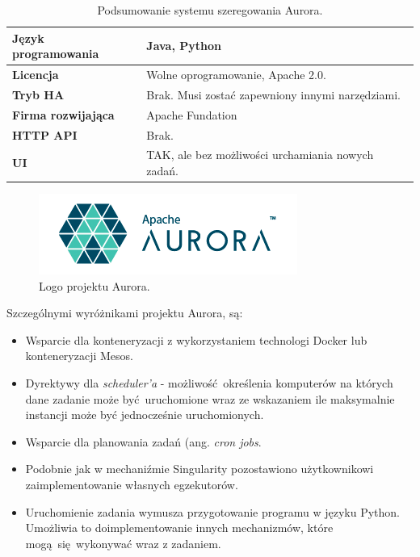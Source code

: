\documentclass[10pt,a4paper,titlepage,twoside]{report}
\begin{document}
\begin{table}[!h]
\caption{Podsumowanie systemu szeregowania Aurora.}
\label{aurora_info}
\centering
\begin{tabular}{|p{4cm}|p{6cm}|}
  \hline
  \textbf{Język programowania} & Java, Python \\
  \hline
  \textbf{Licencja} & Wolne oprogramowanie, Apache 2.0. \\
  \hline
  \textbf{Tryb HA} & Brak. Musi zostać zapewniony innymi narzędziami. \\
  \hline
  \textbf{Firma rozwijająca} & Apache Fundation \\
  \hline
  \textbf{HTTP API} & Brak. \\
  \hline
  \textbf{UI} & TAK, ale bez możliwości urchamiania nowych zadań. \\
  \hline
\end{tabular}
\end{table}

\begin{figure}[!h]
	\centering
	\includegraphics[scale=1]{pics/aurora_logo.png}
	\caption{Logo projektu Aurora.}
	\label{aurora_logo}
\end{figure}

Szczególnymi wyróżnikami projektu Aurora, są:
\begin{itemize}
\item Wsparcie dla konteneryzacji z wykorzystaniem technologi Docker lub konteneryzacji Mesos.
\item Dyrektywy dla \textit{scheduler'a} - możliwość określenia komputerów na których dane zadanie może być uruchomione wraz ze wskazaniem ile maksymalnie instancji może być jednocześnie uruchomionych.
\item Wsparcie dla planowania zadań (ang. \textit{cron jobs}.
\item Podobnie jak w mechaniźmie Singularity pozostawiono użytkownikowi zaimplementowanie własnych egzekutorów.
\item Uruchomienie zadania wymusza przygotowanie programu w języku Python. Umożliwia to doimplementowanie innych mechanizmów, które mogą się wykonywać wraz z zadaniem.
\end{itemize}
\end{document}
